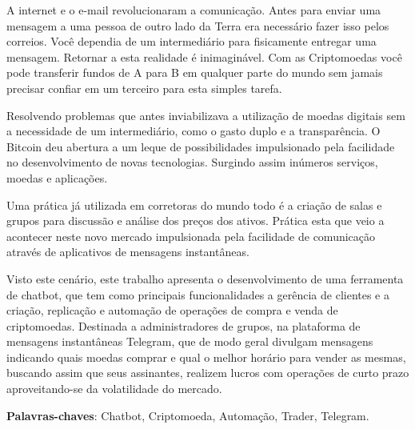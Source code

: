 \begin{resumo}


A internet e o e-mail revolucionaram a comunicação. Antes para enviar uma mensagem a uma pessoa de outro lado da Terra era necessário fazer isso pelos correios. Você dependia de um intermediário para fisicamente entregar uma mensagem. Retornar a esta realidade é inimaginável. Com as Criptomoedas você pode transferir fundos de A para B em qualquer parte do mundo sem jamais precisar confiar em um terceiro para esta simples tarefa. 

Resolvendo problemas que antes inviabilizava a utilização de moedas digitais sem a necessidade de um intermediário, como o gasto duplo e a transparência.  O Bitcoin deu abertura a um leque de possibilidades impulsionado pela facilidade no desenvolvimento de novas tecnologias. Surgindo assim inúmeros serviços, moedas e aplicações.

Uma prática já utilizada em corretoras do mundo todo é a criação de salas e grupos para discussão e análise dos preços dos ativos. Prática esta que veio a acontecer neste novo mercado impulsionada pela facilidade de comunicação através de aplicativos de mensagens instantâneas.

Visto este cenário, este trabalho apresenta o desenvolvimento de uma ferramenta de chatbot, que tem como principais funcionalidades a gerência de clientes e a criação, replicação e automação de operações de compra e venda de criptomoedas. Destinada a administradores de grupos, na plataforma de mensagens instantâneas Telegram, que de modo geral divulgam mensagens indicando quais moedas comprar e qual o melhor horário para vender as mesmas, buscando assim que seus assinantes, realizem lucros com operações de curto prazo aproveitando-se da volatilidade do mercado.

\vspace{\onelineskip}
\noindent
\textbf{Palavras-chaves}: Chatbot, Criptomoeda, Automação, Trader, Telegram.
\end{resumo}